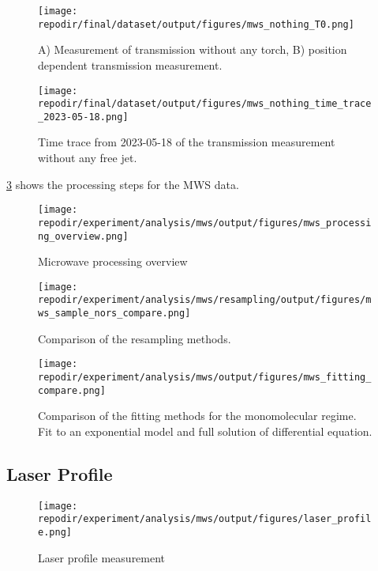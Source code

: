 \begin{figure}[]
\centering
\texttt{[image: \\repodir/final/dataset/output/figures/mws\_nothing\_T0.png]}
\caption{A) Measurement of transmission without any torch, B) position dependent transmission measurement.}
\label{fig:SI_MWS}
\end{figure}


\begin{figure}[]
\centering
\texttt{[image: \\repodir/final/dataset/output/figures/mws\_nothing\_time\_trace\_2023-05-18.png]}
\caption{Time trace from 2023-05-18 of the transmission measurement without any free jet.}
\label{fig:SI_MWS}
\end{figure}

\ref{fig:SI_mws_processing_overview} shows the processing steps for the MWS data. 



\begin{figure}[]
\centering
\texttt{[image: \\repodir/experiment/analysis/mws/output/figures/mws\_processing\_overview.png]}
\caption{Microwave processing overview}
\label{fig:SI_mws_processing_overview}
\end{figure}

\begin{figure}
\centering
\texttt{[image: \\repodir/experiment/analysis/mws/resampling/output/figures/mws\_sample\_nors\_compare.png]}
\caption{Comparison of the resampling methods.}
\label{fig:SI_mws_resampling}
\end{figure}


\begin{figure}
\centering
\texttt{[image: \\repodir/experiment/analysis/mws/output/figures/mws\_fitting\_compare.png]}
\caption{Comparison of the fitting methods for the monomolecular regime. Fit to an exponential model and full solution of differential equation. }
\label{fig:SI_mws_fitting_compare}
\end{figure}

\clearpage
\subsection{Laser Profile}


\begin{figure}[H]
\centering
\texttt{[image: \\repodir/experiment/analysis/mws/output/figures/laser\_profile.png]}
\caption{Laser profile measurement}
\label{fig:SI_Laser_Profile}
\end{figure}

